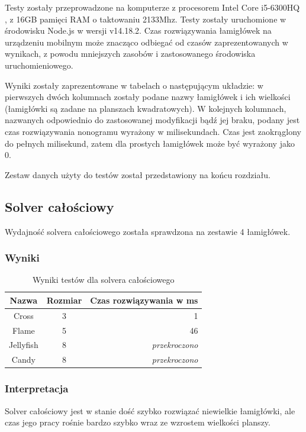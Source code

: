     Testy zostały przeprowadzone na komputerze z procesorem Intel Core i5-6300HQ \cite{i5-6300hq}, z
16GB pamięci RAM o taktowaniu 2133Mhz. Testy zostały uruchomione w środowisku Node.js \cite{node}
w wersji v14.18.2. Czas rozwiązywania łamigłówek na urządzeniu mobilnym może znacząco odbiegać
od czasów zaprezentowanych w wynikach, z powodu mniejszych zasobów i zastosowanego środowiska
uruchomieniowego.

    Wyniki zostały zaprezentowane w tabelach o następującym układzie: w pierwszych dwóch kolumnach
zostały podane nazwy łamigłówek i ich wielkości (łamigłówki są zadane na planszach kwadratowych).
W kolejnych kolumnach, nazwanych odpowiednio do zastosowanej modyfikacji bądź jej braku,
podany jest czas rozwiązywania nonogramu wyrażony w milisekundach. Czas jest zaokrąglony do pełnych
milisekund, zatem dla prostych łamigłówek może być wyrażony jako 0.

    Zestaw danych użyty do testów został przedstawiony na końcu rozdziału.


\subsection{Solver całościowy}
    Wydajność solvera całościowego została sprawdzona na zestawie 4 łamigłówek.

\subsubsection{Wyniki}
\begin{table}[h]
    \begin{center}
        \begin{tabular}{|c|c|r|}
            \hline
            Nazwa          & Rozmiar        & Czas rozwiązywania w ms \\
            \hline
            Cross       & 3 & 1                     \\
            Flame       & 5 & 46                    \\
            Jellyfish   & 8 & \textit{przekroczono} \\
            Candy       & 8 & \textit{przekroczono} \\
            \hline
        \end{tabular}
    \end{center}
    \caption{Wyniki testów dla solvera całościowego}
\end{table}

\subsubsection{Interpretacja}
    Solver całościowy jest w stanie dość szybko rozwiązać niewielkie łamigłówki,
ale czas jego pracy rośnie bardzo szybko wraz ze wzrostem wielkości planszy.


